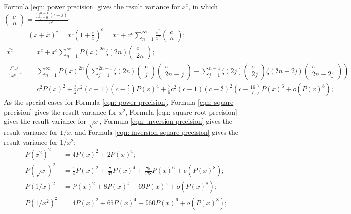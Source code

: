 \documentclass[twoside]{article}
\numberwithin{equation}{section}
\begin{document}
Formula \eqref{eqn: power precision} gives the result variance for $x^c$, in which $\begin{pmatrix} c \\ n \end{pmatrix} = \frac{\prod_{j=0}^{n-1} (c -j)}{n!}$:
\begin{align}
\label{eqn: power Taylor}
&(x + \tilde{x})^c = x^c (1 + \frac{\tilde{x}}{x})^c = x^c + x^c \sum_{n=1}^{\infty} \frac{\tilde{x}^n}{x^n} \begin{pmatrix} c \\ n \end{pmatrix}; \\
\overline{x^c} &= x^c + x^c \sum_{n=1}^{\infty} P(x)^{2n} \zeta(2n) \begin{pmatrix} c \\ 2 n \end{pmatrix}; \\
\label{eqn: power precision}
\frac{\delta^2 x^c}{(x^c)^2} &= \sum_{n=1}^{\infty} P(x)^{2n} 
 \left( \sum_{j=1}^{2n-1} \zeta(2n) \begin{pmatrix} c \\ j \end{pmatrix} \begin{pmatrix} c \\ 2n - j \end{pmatrix}
 - \sum_{j=1}^{n-1} \zeta(2j) \begin{pmatrix} c \\ 2j \end{pmatrix} \zeta(2n - 2j) \begin{pmatrix} c \\ 2n -2 j \end{pmatrix}  \right)\\
 &= c^2 P(x)^2 + \frac{3}{2} c^2 (c-1) (c - \frac{5}{3}) P(x)^4 + \frac{7}{6} c^2 (c-1) (c-2)^2 (c - \frac{16}{7}) P(x)^6 + o(P(x)^8);
\end{align}
As the special cases for Formula \eqref{eqn: power precision}, Formula \eqref{eqn: square precision} gives the result variance for $x^2$, Formula \eqref{eqn: square root precision} gives the result variance for $\sqrt{x}$, Formula \eqref{eqn: inversion precision} gives the result variance for $1/x$, and Formula \eqref{eqn: inversion square precision} gives the result variance for $1/x^2$: 
\begin{align}
\label{eqn: square precision}
P(x^2)^2 &= 4 P(x)^2 + 2 P(x)^4; \\
\label{eqn: square root precision}
P(\sqrt{x})^2 &= \frac{1}{4} P(x)^2 + \frac{7}{32} P(x)^4 + \frac{75}{128} P(x)^6 + o(P(x)^8); \\
\label{eqn: inversion precision}
P(1/x)^2 &= P(x)^2 + 8 P(x)^4 + 69 P(x)^6 + o(P(x)^8); \\
\label{eqn: inversion square precision}
P(1/x^2)^2 &= 4 P(x)^2 + 66 P(x)^4 + 960 P(x)^6 + o(P(x)^8);
\end{align}
\end{document}
